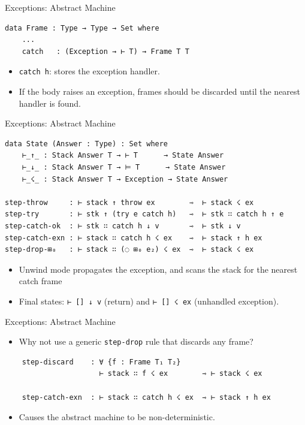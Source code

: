 \documentclass[10pt,compress,aspectratio=169]{beamer}
\begin{document}
\begin{frame}[fragile]{Exceptions: Abstract Machine}
\begin{verbatim}
data Frame : Type → Type → Set where
    ...
    catch   : (Exception → ⊢ T) → Frame T T
\end{verbatim}
\begin{itemize}
    \item \texttt{catch h}: stores the exception handler.
    \item If the body raises an exception, frames should be discarded until the nearest handler is found.
\end{itemize}
\end{frame}

\begin{frame}[fragile]{Exceptions: Abstract Machine}
\begin{verbatim}
data State (Answer : Type) : Set where
    ⊢_↑_ : Stack Answer T → ⊢ T      → State Answer
    ⊢_↓_ : Stack Answer T → ⊨ T      → State Answer
    ⊢_☇_ : Stack Answer T → Exception → State Answer

step-throw     : ⊢ stack ↑ throw ex        ⇾  ⊢ stack ☇ ex
step-try       : ⊢ stk ↑ (try e catch h)   ⇾  ⊢ stk ∷ catch h ↑ e
step-catch-ok  : ⊢ stk ∷ catch h ↓ v       ⇾  ⊢ stk ↓ v
step-catch-exn : ⊢ stack ∷ catch h ☇ ex    ⇾  ⊢ stack ↑ h ex
step-drop-⊞₀   : ⊢ stack ∷ (◌ ⊞₀ e₂) ☇ ex  ⇾  ⊢ stack ☇ ex
\end{verbatim}
\begin{itemize}
    \item Unwind mode propagates the exception, and scans the stack for the nearest catch frame
    \item Final states: \texttt{⊢ [] ↓ v} (return) and \texttt{⊢ [] ☇ ex} (unhandled exception).
\end{itemize}
\end{frame}

\begin{frame}[fragile]{Exceptions: Abstract Machine}
\begin{itemize}
    \item Why not use a generic \texttt{step-drop} rule that discards any frame?
\end{itemize}
\begin{verbatim}
    step-discard    : ∀ {f : Frame T₁ T₂}
                      ⊢ stack ∷ f ☇ ex        ⇾ ⊢ stack ☇ ex

    step-catch-exn  : ⊢ stack ∷ catch h ☇ ex  ⇾ ⊢ stack ↑ h ex
\end{verbatim}

\begin{itemize}
    \item Causes the abstract machine to be non-deterministic. 
\end{itemize}

\end{frame}
\end{document}
